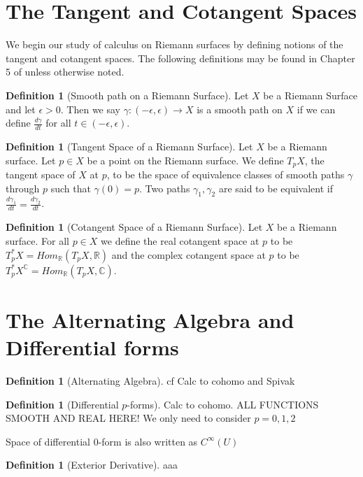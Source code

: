 \documentclass[a4paper,12pt]{report}
\theoremstyle{plain}
\theoremstyle{definition}
\newtheorem{defn}[thm]{Definition}
\begin{document}
\section{The Tangent and Cotangent Spaces}
We begin our study of calculus on Riemann surfaces by defining notions of
the tangent and cotangent spaces. The following definitions may be found
in Chapter 5 of \cite{donaldson} unless otherwise noted.

\begin{defn}[Smooth path on a Riemann Surface]\label{Smooth Path}
  Let $X$ be a Riemann Surface and let $\epsilon > 0$. Then we say
  $\gamma:(-\epsilon,\epsilon) \rightarrow X$ is a smooth path on $X$ if
  we can define $\frac{d\gamma}{dt}$ for all $t \in (-\epsilon,\epsilon)$.
\end{defn}

\begin{defn}[Tangent Space of a Riemann Surface]\label{TpX}
  Let $X$ be a Riemann surface. Let $p \in X$ be a point on the Riemann
  surface. We define $T_pX$, the tangent space of $X$ at
  $p$, to be the
  space of equivalence classes of smooth paths $\gamma$ through $p$ such
  that $\gamma(0)=p$. Two paths $\gamma_1, \gamma_2$ are said to be
  equivalent if $\frac{d\gamma_1}{dt}=\frac{d\gamma_2}{dt}$.
\end{defn}

\begin{defn}[Cotangent Space of a Riemann Surface]\label{T*pX}
  Let $X$ be a Riemann surface. For all $p \in X$ we define the real
  cotangent space at $p$ to be
  $T^*_pX = Hom_{\mathbb{R}}(T_pX, \mathbb{R})$ and the complex cotangent
  space at $p$ to be
  $T^*_pX^{\mathbb{C}} = Hom_{\mathbb{R}}(T_pX,\mathbb{C})$.
\end{defn}

\section{The Alternating Algebra and Differential forms}

\begin{defn}[Alternating Algebra]\label{AltAlg}
  cf Calc to cohomo and Spivak  
\end{defn}

\begin{defn}[Differential $p$-forms]\label{p-form}
  Calc to cohomo. ALL FUNCTIONS SMOOTH AND REAL HERE! We only need to consider $p=0,1,2$
\end{defn}
  Space of differential $0$-form is also written as $C^{\infty}(U)$
\begin{defn}[Exterior Derivative]\label{exteriorD}
  aaa
\end{defn}
\end{document}

